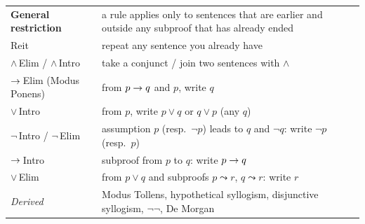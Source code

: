 \begin{nbsummary}
\small
\begin{tabularx}{\linewidth}{@{}l X@{}}
\textbf{General restriction} & a rule applies only to sentences that are earlier and
outside any subproof that has already ended \\
Reit & repeat any sentence you already have \\
$\land$\,Elim / $\land$\,Intro & take a conjunct / join two sentences with $\land$ \\
$\rightarrow$\,Elim (Modus Ponens) & from $p \rightarrow q$ and $p$, write $q$ \\
$\lor$\,Intro & from $p$, write $p \lor q$ or $q \lor p$ (any $q$) \\
$\neg$\,Intro / $\neg$\,Elim & assumption $p$ (resp.\ $\neg p$) leads to $q$ and $\neg q$:
write $\neg p$ (resp.\ $p$) \\
$\rightarrow$\,Intro & subproof from $p$ to $q$: write $p \rightarrow q$ \\
$\lor$\,Elim & from $p \lor q$ and subproofs $p \leadsto r$, $q \leadsto r$: write $r$ \\
\textit{Derived} & Modus Tollens, hypothetical syllogism, disjunctive syllogism, $\neg\neg$,
De Morgan
\end{tabularx}
\end{nbsummary}
